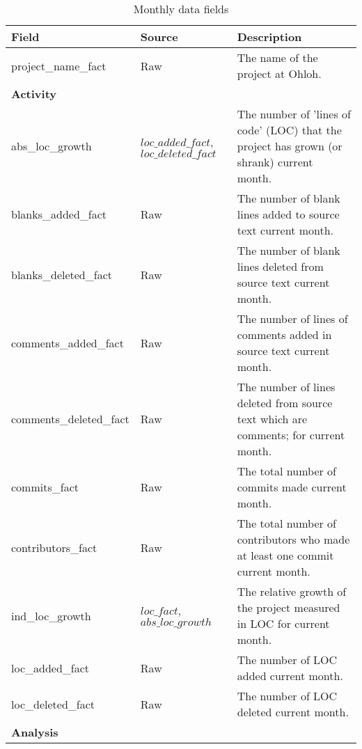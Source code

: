 \newcommand{\tableHeadDataFields}{\bfseries{Field}\rm & \bfseries{Source}\rm &
\bfseries{Description}\rm}
\begin{table}
	\caption{Monthly data fields}\label{table:fields}
	\begin{tabular}{p{4cm} p{3cm} p{7.5cm}}
		\hline
		\tableHeadDataFields \\ \hline
		
		project\_name\_fact & Raw & The name of the project at Ohloh. \\
		\hline
		
		\bfseries{Activity}\rm \\ \hline

		abs\_loc\_growth & $loc\_added\_fact$, $loc\_deleted\_fact$ & The number of
		'lines of code' (LOC) that the project has grown (or shrank) current month. \\

		blanks\_added\_fact & Raw & The number of blank lines added to source text
		current month. \\

		blanks\_deleted\_fact & Raw & The number of blank lines deleted from source
		text current month. \\

		comments\_added\_fact & Raw & The number of lines of comments added in source
		text current month. \\

		comments\_deleted\_fact & Raw & The number of lines deleted from source text
		which are comments; for current month. \\

		commits\_fact & Raw & The total number of commits made current month. \\

		contributors\_fact & Raw & The total number of contributors who made at least
		one commit current month. \\

		ind\_loc\_growth & $loc\_fact$, $abs\_loc\_growth$ & The relative growth of
		the project measured in LOC for current month. \\

		loc\_added\_fact & Raw & The number of LOC added current month. \\

		loc\_deleted\_fact & Raw & The number of LOC deleted current month. \\
		\hline
		
		\bfseries{Analysis}\rm \\ \hline


\end{tabular}
\end{table}
